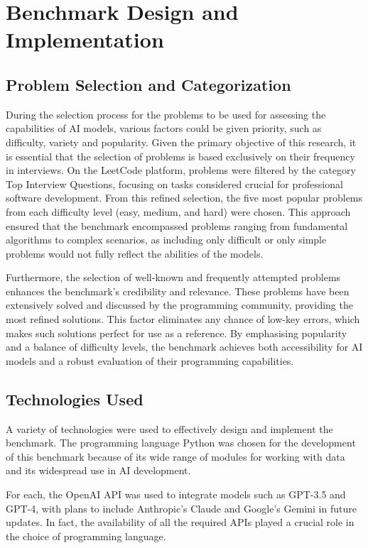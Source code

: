 \section{Benchmark Design and Implementation}

\subsection{Problem Selection and Categorization}

During the selection process for the problems to be used for assessing the capabilities of AI models, various factors could be given priority, such as difficulty, variety and popularity. Given the primary objective of this research, it is essential that the selection of problems is based exclusively on their frequency in interviews. On the LeetCode platform, problems were filtered by the category Top Interview Questions, focusing on tasks considered crucial for professional software development. From this refined selection, the five most popular problems from each difficulty level (easy, medium, and hard) were chosen. This approach ensured that the benchmark encompassed problems ranging from fundamental algorithms to complex scenarios, as including only difficult or only simple problems would not fully reflect the abilities of the models.

Furthermore, the selection of well-known and frequently attempted problems enhances the benchmark's credibility and relevance. These problems have been extensively solved and discussed by the programming community, providing the most refined solutions. This factor eliminates any chance of low-key errors, which makes such solutions perfect for use as a reference. By emphasising popularity and a balance of difficulty levels, the benchmark achieves both accessibility for AI models and a robust evaluation of their programming capabilities.
\subsection{Technologies Used}


A variety of technologies were used to effectively design and implement the benchmark. The programming language Python was chosen for the development of this benchmark because of its wide range of modules for working with data and its widespread use in AI development.

For each, the OpenAI API was used to integrate models such as GPT-3.5 and GPT-4, with plans to include Anthropic's Claude and Google's Gemini in future updates.
In fact, the availability of all the required APIs played a crucial role in the choice of programming language.

